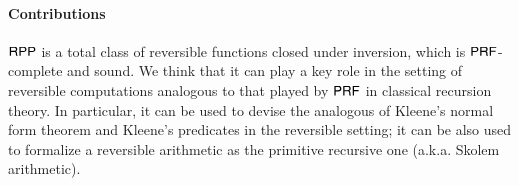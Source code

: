 \paragraph{Contributions}
 $\mathsf{RPP}$ is a total class of reversible functions closed under inversion, which is $ \mathsf{P}\mathsf{RF} $-complete 
and sound. We think that it can play a key role in the setting of reversible computations analogous to that played by $\mathsf{P}\mathsf{RF}$ in classical recursion theory.
In particular, it can be used to devise the analogous of Kleene's normal form theorem and Kleene's predicates in the reversible setting;
it can be also used to formalize a reversible arithmetic as the primitive recursive one (a.k.a. Skolem arithmetic).





